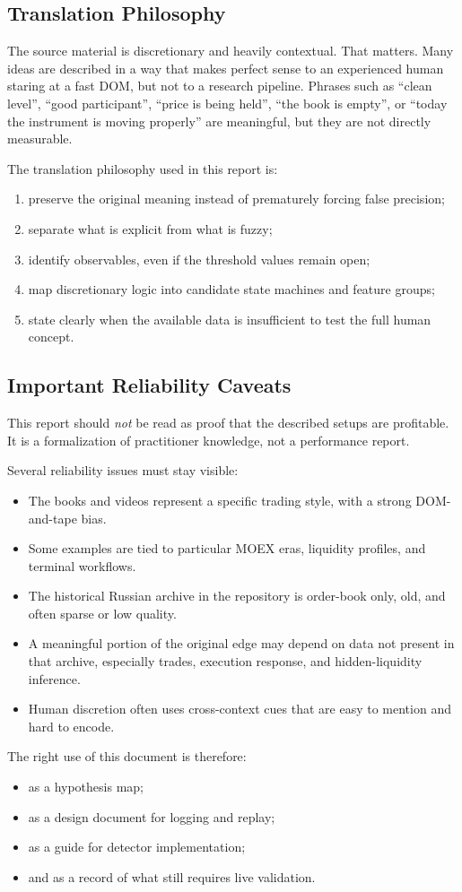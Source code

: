 \subsection{Translation Philosophy}

The source material is discretionary and heavily contextual.
That matters.
Many ideas are described in a way that makes perfect sense to an experienced human staring at a fast DOM, but not to a research pipeline.
Phrases such as ``clean level'', ``good participant'', ``price is being held'', ``the book is empty'', or ``today the instrument is moving properly'' are meaningful, but they are not directly measurable.

The translation philosophy used in this report is:
\begin{enumerate}
  \item preserve the original meaning instead of prematurely forcing false precision;
  \item separate what is explicit from what is fuzzy;
  \item identify observables, even if the threshold values remain open;
  \item map discretionary logic into candidate state machines and feature groups;
  \item state clearly when the available data is insufficient to test the full human concept.
\end{enumerate}

\subsection{Important Reliability Caveats}

This report should \emph{not} be read as proof that the described setups are profitable.
It is a formalization of practitioner knowledge, not a performance report.

Several reliability issues must stay visible:
\begin{itemize}
  \item The books and videos represent a specific trading style, with a strong DOM-and-tape bias.
  \item Some examples are tied to particular MOEX eras, liquidity profiles, and terminal workflows.
  \item The historical Russian archive in the repository is order-book only, old, and often sparse or low quality.
  \item A meaningful portion of the original edge may depend on data not present in that archive, especially trades, execution response, and hidden-liquidity inference.
  \item Human discretion often uses cross-context cues that are easy to mention and hard to encode.
\end{itemize}

The right use of this document is therefore:
\begin{itemize}
  \item as a hypothesis map;
  \item as a design document for logging and replay;
  \item as a guide for detector implementation;
  \item and as a record of what still requires live validation.
\end{itemize}
